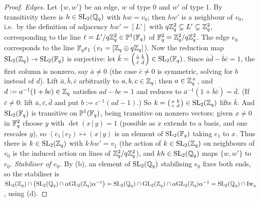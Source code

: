 \begin{proof}
\emph{Edges.} Let $\{w,w'\}$ be an edge, $w$ of type $0$ and $w'$ of type $1$. By transitivity there is $h\in\mathrm{SL}_2(\mathbb{Q}_q)$ with $hw=v_0$; then
$hw'$ is a neighbour of $v_0$, i.e.\ by the definition of adjacency $hw'=[L']$ with $q\mathbb{Z}_q^2\subsetneq L'\subsetneq\mathbb{Z}_q^2$, corresponding to the line $\ell=L'/q\mathbb{Z}_q^2\in\mathbb P^1(\mathbb{F}_q)$ of
$\mathbb{F}_q^2=\mathbb{Z}_q^2/q\mathbb{Z}_q^2$. The edge $e_0$ corresponds to the line $\mathbb{F}_q e_1$ ($v_1=[\mathbb{Z}_q\oplus q\mathbb{Z}_q]$). Now the reduction map $\mathrm{SL}_2(\mathbb{Z}_q)\to\mathrm{SL}_2(\mathbb{F}_q)$ is
surjective: let $\bar k=\left(\begin{smallmatrix}\bar a&\bar b\\\bar c&\bar d\end{smallmatrix}\right)\in\mathrm{SL}_2(\mathbb{F}_q)$. Since $\bar a\bar d-\bar b\bar c=1$,
the first column is nonzero, say $\bar a\neq0$ (the case $\bar c\neq0$ is symmetric, solving for $b$ instead of $d$). Lift $\bar a,\bar b,\bar c$
arbitrarily to $a,b,c\in\mathbb{Z}_q$; then $a\in\mathbb{Z}_q^\times$, and $d:=a^{-1}(1+bc)\in\mathbb{Z}_q$ satisfies $ad-bc=1$ and reduces to
$\bar a^{-1}(1+\bar b\bar c)=\bar d$. (If $\bar c\neq0$: lift $\bar a,\bar c,\bar d$ and put $b:=c^{-1}(ad-1)$.) So
$k=\left(\begin{smallmatrix}a&b\\c&d\end{smallmatrix}\right)\in\mathrm{SL}_2(\mathbb{Z}_q)$ lifts $\bar k$.
And $\mathrm{SL}_2(\mathbb{F}_q)$ is transitive on $\mathbb P^1(\mathbb{F}_q)$, being transitive on nonzero vectors: given $x\neq0$ in $\mathbb{F}_q^2$ choose $y$ with
$\det(x\,|\,y)=1$ (possible as $x$ extends to a basis, and one rescales $y$), so $(e_1\,|\,e_2)\mapsto(x\,|\,y)$ is an element of $\mathrm{SL}_2(\mathbb{F}_q)$ taking $e_1$ to $x$.
Thus there is $k\in\mathrm{SL}_2(\mathbb{Z}_q)$ with $k\,hw'=v_1$ (the action of $k\in\mathrm{SL}_2(\mathbb{Z}_q)$ on neighbours of $v_0$ is the induced action on lines of $\mathbb{Z}_q^2/q\mathbb{Z}_q^2$), and
$kh\in\mathrm{SL}_2(\mathbb{Q}_q)$ maps $\{w,w'\}$ to $e_0$.
\emph{Stabiliser of $e_0$.} By (b), an element of $\mathrm{SL}_2(\mathbb{Q}_q)$ stabilising $e_0$ fixes both ends, so the stabiliser is
$\mathrm{SL}_2(\mathbb{Z}_q)\cap\big(\mathrm{SL}_2(\mathbb{Q}_q)\cap\alpha\mathrm{GL}_2(\mathbb{Z}_q)\alpha^{-1}\big)=\mathrm{SL}_2(\mathbb{Q}_q)\cap\mathrm{GL}_2(\mathbb{Z}_q)\cap\alpha\mathrm{GL}_2(\mathbb{Z}_q)\alpha^{-1}=\mathrm{SL}_2(\mathbb{Q}_q)\cap\mathrm{Iw}_q$, using (d).


\end{proof}
